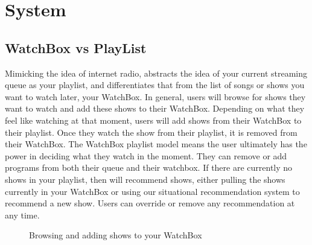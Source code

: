 \section{System}

\subsection{WatchBox vs PlayList}
Mimicking the idea of internet radio, {\sys} abstracts the idea of
your current streaming queue as your playlist, and differentiates that
from the list of songs or shows you want to watch later, your
WatchBox.  In general, users will browse for shows they want to watch
and add these shows to their WatchBox.  Depending on what they feel
like watching at that moment, users will add shows from their WatchBox
to their playlist.  Once they watch the show from their playlist, it
is removed from their WatchBox.  The WatchBox playlist model means the
user ultimately has the power in deciding what they watch in the
moment.  They can remove or add programs from both their queue
and their watchbox.  If there are currently no shows in your playlist,
then {\sys} will recommend shows, either pulling the shows currently
in your WatchBox or using our situational recommendation system to
recommend a new show.  Users can override or remove any recommendation
at any time.


\begin{figure}
\centering
{}

\caption{Browsing and adding shows to your WatchBox}
\label{fig:watchbox}
\end{figure}

